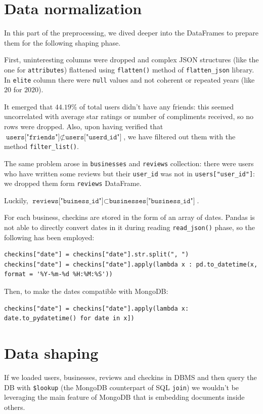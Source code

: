 \documentclass{Configuration_Files/PoliMi3i_thesis}
\begin{document}
\section{Data normalization}
In this part of the preprocessing, we dived deeper into the DataFrames to prepare them for the following shaping phase. 

First, uninteresting columns were dropped and complex JSON structures (like the one for \texttt{attributes}) flattened using \texttt{flatten()} method of \texttt{flatten\_json} library. In \texttt{elite} column there were \texttt{null} values and not coherent or repeated years (like $20$ for $2020$). 

It emerged that $44.19\%$ of total users didn't have any friends: this seemed uncorrelated with average star ratings or number of compliments received, so no rows were dropped. Also, upon having verified that $\texttt{users["friends"]} \not \subset \texttt{users["userd\_id"]}$, we have filtered out them with the method \texttt{filter\_list()}.

The same problem arose in \texttt{businesses} and \texttt{reviews} collection: there were users who have written some reviews but their \texttt{user\_id} was not in \texttt{users["user\_id"]}: we dropped them form \texttt{reviews} DataFrame. 

Luckily,  $\texttt{reviews["buiness\_id"]} \subset \texttt{businesses["business\_id"]}$. 

For each business, checkins are stored in the form of an array of dates. Pandas is not able to directly convert dates in it during reading \texttt{read\_json()} phase, so the following has been employed:
\begin{verbatim}
checkins["date"] = checkins["date"].str.split(", ")
checkins["date"] = checkins["date"].apply(lambda x : pd.to_datetime(x, 
format = '%Y-%m-%d %H:%M:%S'))
\end{verbatim}

\bigskip

Then, to make the dates compatible with MongoDB:
\begin{verbatim}
checkins["date"] = checkins["date"].apply(lambda x: 
date.to_pydatetime() for date in x])
\end{verbatim}

\section{Data shaping}
If we loaded users, businesses, reviews and checkins in DBMS and then query the DB with \texttt{\$lookup} (the MongoDB counterpart of SQL \texttt{join}) we wouldn't be leveraging the main feature of MongoDB that is embedding documents inside others.
\end{document}
